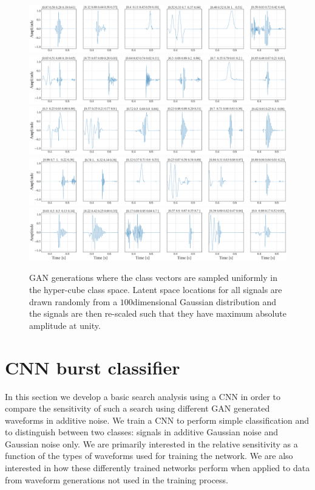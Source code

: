 \documentclass[12pt]{iopart}
\newcommand{\ndimensional}[1]{$#1$\nobreakdash\discretionary{-}{-}{-}dimensional}
\begin{document}
\begin{figure}
    \centering
    \includegraphics[width=\textwidth]{figures/generations/uniform_sample1.png}
    \includegraphics[width=\textwidth]{figures/generations/uniform_sample2.png}
    \includegraphics[width=\textwidth]{figures/generations/uniform_sample3.png}
    \includegraphics[width=\textwidth]{figures/generations/uniform_sample4.png}
    \includegraphics[width=\textwidth]{figures/generations/uniform_sample5.png}
    \caption{GAN generations where the class vectors are sampled uniformly in the hyper-cube class space. Latent space locations for all signals are drawn randomly from a \ndimensional{100} Gaussian distribution and the signals are then re-scaled such that they have maximum absolute amplitude at unity.}
    \label{fig:uniform_samples}
\end{figure}

\section{CNN burst classifier} \label{cnn classifier}
In this section we develop a basic search analysis using a \ac{CNN} in order to compare the sensitivity of such a search using different \ac{GAN} generated waveforms in additive noise. We train a \ac{CNN} to perform simple classification and to distinguish between two classes: signals in additive Gaussian noise and Gaussian noise only. We are primarily interested in the relative sensitivity as a function of the types of waveforms used for training the network. We are also interested in how these differently trained networks perform when applied to data from waveform generations not used in the training process.
\end{document}
